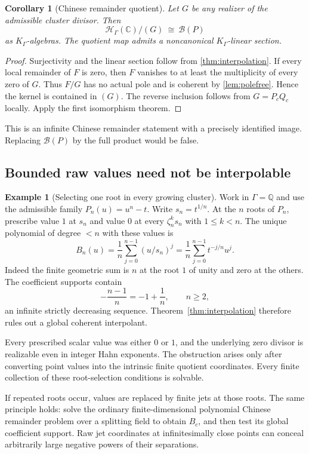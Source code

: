 \documentclass[11pt,letterpaper]{article}
\newtheorem{corollary}[theorem]{Corollary}
\theoremstyle{definition}
\newtheorem{example}[theorem]{Example}
\theoremstyle{remark}
\newcommand{\C}{\mathbb C}
\newcommand{\Q}{\mathbb Q}
\newcommand{\HH}{\mathscr H_\Gamma}
\newcommand{\KG}{K_\Gamma}
\newcommand{\BB}{\mathscr B(P)}
\numberwithin{equation}{section}
\begin{document}
\begin{corollary}[Chinese remainder quotient]\label{cor:CRT}
Let $G$ be any realizer of the admissible cluster divisor. Then
\begin{equation}\label{eq:CRT}
 \HH(\C)/(G)\ \cong\ \BB
\end{equation}
as $\KG$-algebras. The quotient map admits a noncanonical $\KG$-linear section.
\end{corollary}
\begin{proof}
Surjectivity and the linear section follow from \cref{thm:interpolation}. If every local remainder of $F$ is zero, then $F$ vanishes to at least the multiplicity of every zero of $G$. Thus $F/G$ has no actual pole and is coherent by \cref{lem:polefree}. Hence the kernel is contained in $(G)$. The reverse inclusion follows from $G=P_cQ_c$ locally. Apply the first isomorphism theorem.
\end{proof}
This is an infinite Chinese remainder statement with a precisely identified image. Replacing $\BB$ by the full product would be false.

\subsection{Bounded raw values need not be interpolable}
\begin{example}[Selecting one root in every growing cluster]\label{ex:selector}
Work in $\Gamma=\Q$ and use the admissible family $P_n(u)=u^n-t$. Write $s_n=t^{1/n}$. At the $n$ roots of $P_n$, prescribe value $1$ at $s_n$ and value $0$ at every $\zeta_n^ks_n$ with $1\le k<n$. The unique polynomial of degree $<n$ with these values is
\begin{equation}\label{eq:selector}
 B_n(u)=\frac1n\sum_{j=0}^{n-1}(u/s_n)^j
 =\frac1n\sum_{j=0}^{n-1}t^{-j/n}u^j.
\end{equation}
Indeed the finite geometric sum is $n$ at the root $1$ of unity and zero at the others. The coefficient supports contain
\[
 -\frac{n-1}{n}=-1+\frac1n,\qquad n\ge2,
\]
an infinite strictly decreasing sequence. Theorem~\ref{thm:interpolation} therefore rules out a global coherent interpolant.

Every prescribed scalar value was either $0$ or $1$, and the underlying zero divisor is realizable even in integer Hahn exponents. The obstruction arises only after converting point values into the intrinsic finite quotient coordinates. Every finite collection of these root-selection conditions is solvable.
\end{example}
If repeated roots occur, values are replaced by finite jets at those roots. The same principle holds: solve the ordinary finite-dimensional polynomial Chinese remainder problem over a splitting field to obtain $B_c$, and then test its global coefficient support. Raw jet coordinates at infinitesimally close points can conceal arbitrarily large negative powers of their separations.
\end{document}
